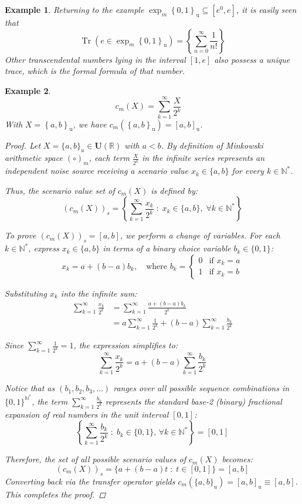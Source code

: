 \documentclass[a4paper,12pt,twoside]{memoir}
\newtheorem{example}{Example}[chapter]
\DeclareMathOperator{\Tr}{Tr}
\newcommand{\set}[1]{\left\{#1\right\}} %
\newcommand{\s}[1]{\set{#1}_\mathrm{u}} %
\newcommand{\kbd}[1]{{#1}_\mathrm{u}} %
\newcommand{\tsbd}[1]{\mathbf{U}(\mathbb{#1})}
\newcommand{\hbd}[2]{#1_m\left(#2\right)} %
\begin{document}
	\begin{example}
		Returning to the example $\exp_m\s{0,1} \subseteq [e^0,e]$, it is easily seen that
		$$\Tr(e \in \exp_m\s{0,1}) = \left\{\sum_{n=0}^{\infty}\frac{1}{n!}\right\}$$
		Other transcendental numbers lying in the interval $[1,e]$ also possess a unique trace, which is the formal formula of that number.
	\end{example}
	
	\begin{example}
		$$\hbd{c}{X} = \sum_{k=1}^{\infty} \frac{X}{2^k} \quad$$
		With $X=\s{a,b}$, we have $\hbd{c}{\s{a,b}} = \kbd{[a,b]}$.
		
		\begin{proof}
			Let $X = \{a, b\}_u \in \tsbd{R}$ with $a < b$. By definition of Minkowski arithmetic space $(\circ)_m$, each term $\frac{X}{2^k}$ in the infinite series represents an independent noise source receiving a scenario value $x_k \in \{a, b\}$ for every $k \in \mathbb{N}^*$.
			
			Thus, the scenario value set of $\hbd{c}{X}$ is defined by:
			\[
			(\hbd{c}{X})_s = \left\{ \sum_{k=1}^{\infty} \frac{x_k}{2^k} \;:\; x_k \in \{a, b\}, \; \forall k \in \mathbb{N}^* \right\}
			\]
			
			To prove $(\hbd{c}{X})_s = [a, b]$, we perform a change of variables. For each $k \in \mathbb{N}^*$, express $x_k \in \{a, b\}$ in terms of a binary choice variable $b_k \in \{0, 1\}$:
			\[
			x_k = a + (b - a)b_k, \quad \text{where } b_k = \begin{cases} 0 & \text{if } x_k = a \\ 1 & \text{if } x_k = b \end{cases}
			\]
			
			Substituting $x_k$ into the infinite sum:
			\begin{align*}
				\sum_{k=1}^{\infty} \frac{x_k}{2^k} & = \sum_{k=1}^{\infty} \frac{a + (b - a)b_k}{2^k}                                    \\
				& = a \sum_{k=1}^{\infty} \frac{1}{2^k} + (b - a) \sum_{k=1}^{\infty} \frac{b_k}{2^k}
			\end{align*}
			
			Since $\sum_{k=1}^{\infty} \frac{1}{2^k} = 1$, the expression simplifies to:
			\[
			\sum_{k=1}^{\infty} \frac{x_k}{2^k} = a + (b - a) \sum_{k=1}^{\infty} \frac{b_k}{2^k}
			\]
			
			Notice that as $(b_1, b_2, b_3, \dots)$ ranges over all possible sequence combinations in $\{0, 1\}^{\mathbb{N}^*}$, the term $\sum_{k=1}^{\infty} \frac{b_k}{2^k}$ represents the standard base-2 (binary) fractional expansion of real numbers in the unit interval $[0, 1]$:
			\[
			\left\{ \sum_{k=1}^{\infty} \frac{b_k}{2^k} \;:\; b_k \in \{0, 1\}, \, \forall k \in \mathbb{N}^* \right\} = [0, 1]
			\]
			
			Therefore, the set of all possible scenario values of $\hbd{c}{X}$ becomes:
			\[
			(\hbd{c}{X})_s = \{a + (b - a)t \;:\; t \in [0, 1]\} = [a, b]
			\]
			Converting back via the transfer operator yields $\hbd{c}{\{a, b\}_u} = [a, b]_u \equiv [a, b]$. This completes the proof.
		\end{proof}
	\end{example}
	
\end{document}
